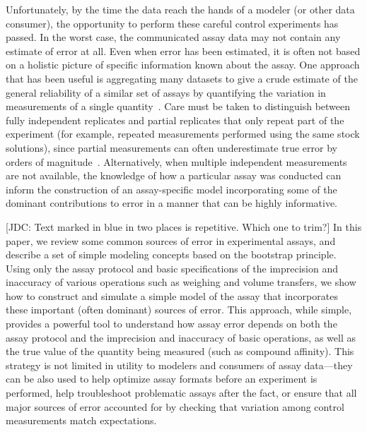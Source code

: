 \documentclass[aps,pre,twocolumn,nofootinbib,superscriptaddress,linenumbers]{revtex4-1}
\begin{document}
Unfortunately, by the time the data reach the hands of a modeler (or other data consumer), the opportunity to perform these careful control experiments has passed.
In the worst case, the communicated assay data may not contain any estimate of error at all. 
Even when error has been estimated, it is often not based on a holistic picture of specific information known about the assay.
One approach that has been useful is aggregating many datasets to give a crude estimate of the general reliability of a similar set of assays by quantifying the variation in measurements of a single quantity~\cite{kramer_experimental_2012,kalliokoski_comparability_2013}. 
Care must be taken to distinguish between fully independent replicates and partial replicates that only repeat part of the experiment (for example, repeated measurements performed using the same stock solutions), since partial measurements can often underestimate true error by orders of magnitude~\cite{chodera_entropy-enthalpy_2013}.
Alternatively, when multiple independent measurements are not available, the knowledge of how a particular assay was conducted can inform the construction of an assay-specific model incorporating some of the dominant contributions to error in a manner that can be highly informative.

\color{blue}
[JDC: Text marked in blue in two places is repetitive.  Which one to trim?]
In this paper, we review some common sources of error in experimental assays, and describe a set of simple modeling concepts based on the bootstrap principle.
Using only the assay protocol and basic specifications of the imprecision and inaccuracy of various operations such as weighing and volume transfers, we show how to construct and simulate a simple model of the assay that incorporates these important (often dominant) sources of error. 
This approach, while simple, provides a powerful tool to understand how assay error depends on both the assay protocol and the imprecision and inaccuracy of basic operations, as well as the true value of the quantity being measured (such as compound affinity). 
\color{black}
This strategy is not limited in utility to modelers and consumers of assay data---they can be also used to help optimize assay formats before an experiment is performed, help troubleshoot problematic assays after the fact, or ensure that all major sources of error accounted for by checking that variation among control measurements match expectations.
\end{document}
